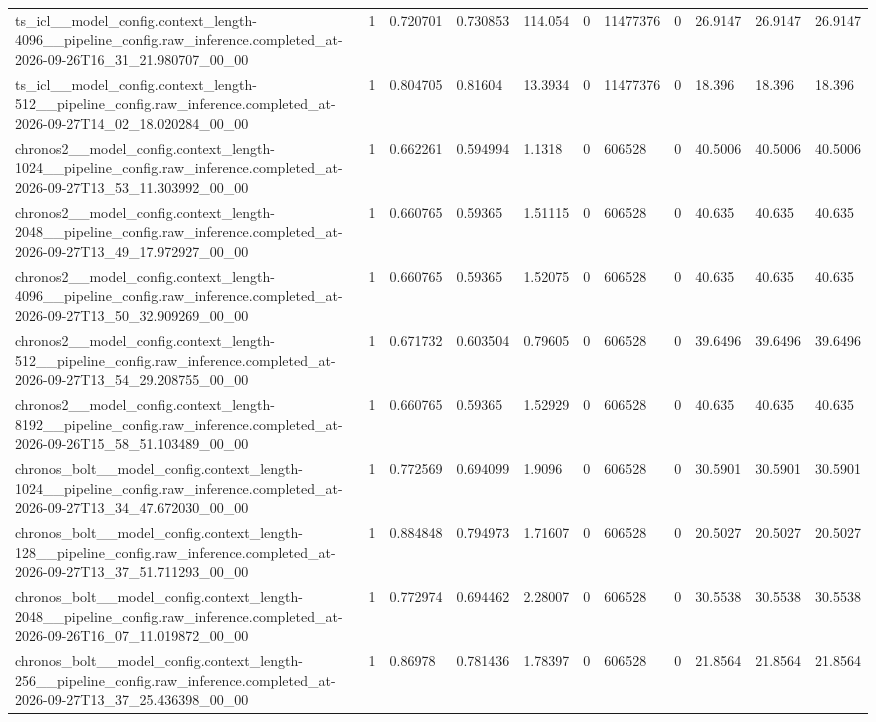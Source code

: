 \begin{tabular}{lllllllllll}
ts\_icl\_\_model\_config.context\_length-4096\_\_pipeline\_config.raw\_inference.completed\_at-2026-09-26T16\_31\_21.980707\_00\_00 & 1 & 0.720701 & 0.730853 & 114.054 & 0 & 11477376 & 0 & 26.9147 & 26.9147 & 26.9147 \\
ts\_icl\_\_model\_config.context\_length-512\_\_pipeline\_config.raw\_inference.completed\_at-2026-09-27T14\_02\_18.020284\_00\_00 & 1 & 0.804705 & 0.81604 & 13.3934 & 0 & 11477376 & 0 & 18.396 & 18.396 & 18.396 \\
chronos2\_\_model\_config.context\_length-1024\_\_pipeline\_config.raw\_inference.completed\_at-2026-09-27T13\_53\_11.303992\_00\_00 & 1 & 0.662261 & 0.594994 & 1.1318 & 0 & 606528 & 0 & 40.5006 & 40.5006 & 40.5006 \\
chronos2\_\_model\_config.context\_length-2048\_\_pipeline\_config.raw\_inference.completed\_at-2026-09-27T13\_49\_17.972927\_00\_00 & 1 & 0.660765 & 0.59365 & 1.51115 & 0 & 606528 & 0 & 40.635 & 40.635 & 40.635 \\
chronos2\_\_model\_config.context\_length-4096\_\_pipeline\_config.raw\_inference.completed\_at-2026-09-27T13\_50\_32.909269\_00\_00 & 1 & 0.660765 & 0.59365 & 1.52075 & 0 & 606528 & 0 & 40.635 & 40.635 & 40.635 \\
chronos2\_\_model\_config.context\_length-512\_\_pipeline\_config.raw\_inference.completed\_at-2026-09-27T13\_54\_29.208755\_00\_00 & 1 & 0.671732 & 0.603504 & 0.79605 & 0 & 606528 & 0 & 39.6496 & 39.6496 & 39.6496 \\
chronos2\_\_model\_config.context\_length-8192\_\_pipeline\_config.raw\_inference.completed\_at-2026-09-26T15\_58\_51.103489\_00\_00 & 1 & 0.660765 & 0.59365 & 1.52929 & 0 & 606528 & 0 & 40.635 & 40.635 & 40.635 \\
chronos\_bolt\_\_model\_config.context\_length-1024\_\_pipeline\_config.raw\_inference.completed\_at-2026-09-27T13\_34\_47.672030\_00\_00 & 1 & 0.772569 & 0.694099 & 1.9096 & 0 & 606528 & 0 & 30.5901 & 30.5901 & 30.5901 \\
chronos\_bolt\_\_model\_config.context\_length-128\_\_pipeline\_config.raw\_inference.completed\_at-2026-09-27T13\_37\_51.711293\_00\_00 & 1 & 0.884848 & 0.794973 & 1.71607 & 0 & 606528 & 0 & 20.5027 & 20.5027 & 20.5027 \\
chronos\_bolt\_\_model\_config.context\_length-2048\_\_pipeline\_config.raw\_inference.completed\_at-2026-09-26T16\_07\_11.019872\_00\_00 & 1 & 0.772974 & 0.694462 & 2.28007 & 0 & 606528 & 0 & 30.5538 & 30.5538 & 30.5538 \\
chronos\_bolt\_\_model\_config.context\_length-256\_\_pipeline\_config.raw\_inference.completed\_at-2026-09-27T13\_37\_25.436398\_00\_00 & 1 & 0.86978 & 0.781436 & 1.78397 & 0 & 606528 & 0 & 21.8564 & 21.8564 & 21.8564 \\

\end{tabular}
